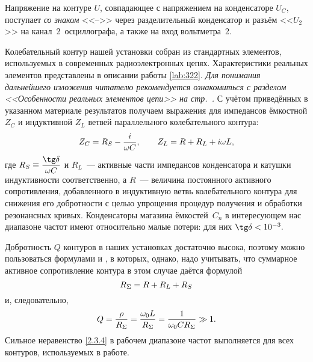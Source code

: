 Напряжение на контуре $U$, совпадающее с напряжением на конденсаторе $U_C$,
поступает \emph{со знаком} <<$–$>> через разделительный конденсатор и разъём
<<${U}_2$>> на канал~2~осциллографа, а также на вход вольтметра~2.


Колебательный контур нашей установки собран из стандартных элементов,
используемых в современных радиоэлектронных цепях. Характеристики реальных элементов
представлены в описании работы \ref{lab:322}. \emph{Для понимания дальнейшего
изложения читателю рекомендуется ознакомиться с разделом
<<Особенности реальных элементов цепи>> на стр.~\pageref{par:real_elements}.} 
С учётом приведённых в указанном материале результатов получаем выражения
для импедансов ёмкостной $Z_C$ и индуктивной $Z_L$ ветвей параллельного 
колебательного контура:
\begin{equation}\eqmark{2.3.2}
	Z_C=R_S-\dfrac{i}{\omega C}, \qquad Z_L=R+R_L+i\omega L,
\end{equation}
где $R_S\equiv\dfrac{\tg\delta}{\omega C}$ и $R_L$~--- активные части
импедансов конденсатора и катушки индуктивности соответственно, а $R$~--- величина
постоянного активного сопротивления, добавленного в индуктивную ветвь
колебательного контура для снижения его добротности с целью упрощения  процедур
получения и обработки резонансных кривых. 
Конденсаторы магазина ёмкостей~$C_n$ в интересующем нас диапазоне
частот имеют относительно малые потери: для них $\tg\delta<10^{-3}.$

Добротность $Q$ контуров в наших установках достаточно высока, поэтому
можно пользоваться формулами  и , в
которых, однако, надо учитывать, что суммарное активное сопротивление контура в
этом случае даётся формулой
\begin{equation}\eqmark{2.3.3}
	R_{\Sigma}=R+R_L+R_S
\end{equation}
и, следовательно,
\begin{equation}\eqmark{2.3.4}
	Q=\frac{\rho}{R_{\Sigma}}=
    \frac{\omega_0 L}{R_{\Sigma}}=
    \frac{1}{\omega_0 CR_{\Sigma}} \gg 1.
\end{equation}
Сильное неравенство \eqref{2.3.4} в рабочем диапазоне частот выполняется для
всех контуров, используемых в работе.

